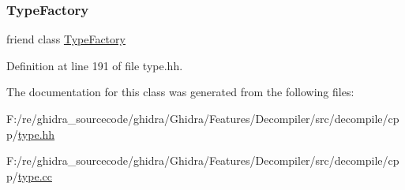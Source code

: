 \subsubsection{\texorpdfstring{TypeFactory}{TypeFactory}}
{\footnotesize\ttfamily friend class \mbox{\hyperlink{class_type_factory}{Type\+Factory}}\hspace{0.3cm}{\ttfamily [friend]}}



Definition at line 191 of file type.\+hh.



The documentation for this class was generated from the following files\+:\begin{DoxyCompactItemize}
\item 
F\+:/re/ghidra\+\_\+sourcecode/ghidra/\+Ghidra/\+Features/\+Decompiler/src/decompile/cpp/\mbox{\hyperlink{type_8hh}{type.\+hh}}\item 
F\+:/re/ghidra\+\_\+sourcecode/ghidra/\+Ghidra/\+Features/\+Decompiler/src/decompile/cpp/\mbox{\hyperlink{type_8cc}{type.\+cc}}\end{DoxyCompactItemize}
